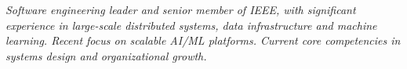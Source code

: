 {\selectfont
	\begin{justify}\textit{Software engineering leader and senior member of IEEE, with significant experience in large-scale distributed systems, data infrastructure and machine learning. Recent focus on scalable AI/ML platforms. Current core competencies in systems design and organizational growth.}\end{justify}
}